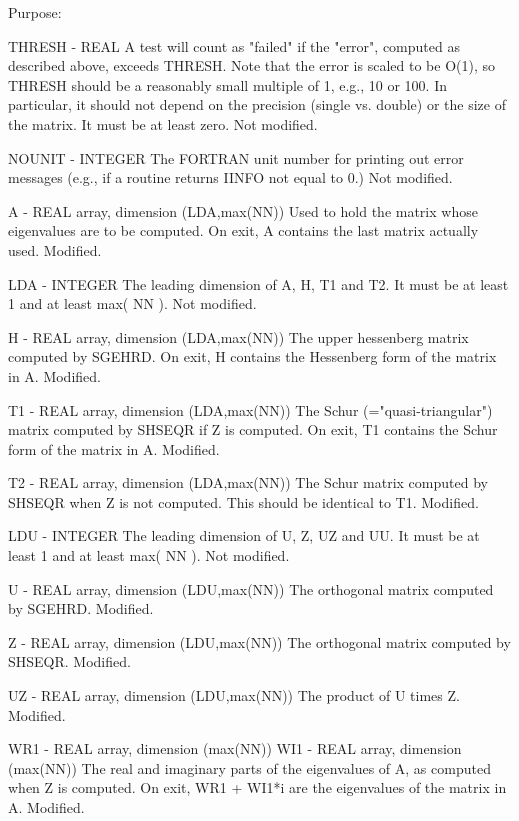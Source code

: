 \begin{DoxyParagraph}{Purpose\+: }
\begin{DoxyVerb}
  THRESH - REAL
           A test will count as "failed" if the "error", computed as
           described above, exceeds THRESH.  Note that the error
           is scaled to be O(1), so THRESH should be a reasonably
           small multiple of 1, e.g., 10 or 100.  In particular,
           it should not depend on the precision (single vs. double)
           or the size of the matrix.  It must be at least zero.
           Not modified.

  NOUNIT - INTEGER
           The FORTRAN unit number for printing out error messages
           (e.g., if a routine returns IINFO not equal to 0.)
           Not modified.

  A      - REAL array, dimension (LDA,max(NN))
           Used to hold the matrix whose eigenvalues are to be
           computed.  On exit, A contains the last matrix actually
           used.
           Modified.

  LDA    - INTEGER
           The leading dimension of A, H, T1 and T2.  It must be at
           least 1 and at least max( NN ).
           Not modified.

  H      - REAL array, dimension (LDA,max(NN))
           The upper hessenberg matrix computed by SGEHRD.  On exit,
           H contains the Hessenberg form of the matrix in A.
           Modified.

  T1     - REAL array, dimension (LDA,max(NN))
           The Schur (="quasi-triangular") matrix computed by SHSEQR
           if Z is computed.  On exit, T1 contains the Schur form of
           the matrix in A.
           Modified.

  T2     - REAL array, dimension (LDA,max(NN))
           The Schur matrix computed by SHSEQR when Z is not computed.
           This should be identical to T1.
           Modified.

  LDU    - INTEGER
           The leading dimension of U, Z, UZ and UU.  It must be at
           least 1 and at least max( NN ).
           Not modified.

  U      - REAL array, dimension (LDU,max(NN))
           The orthogonal matrix computed by SGEHRD.
           Modified.

  Z      - REAL array, dimension (LDU,max(NN))
           The orthogonal matrix computed by SHSEQR.
           Modified.

  UZ     - REAL array, dimension (LDU,max(NN))
           The product of U times Z.
           Modified.

  WR1    - REAL array, dimension (max(NN))
  WI1    - REAL array, dimension (max(NN))
           The real and imaginary parts of the eigenvalues of A,
           as computed when Z is computed.
           On exit, WR1 + WI1*i are the eigenvalues of the matrix in A.
           Modified.


\end{DoxyVerb}
\end{DoxyParagraph}
